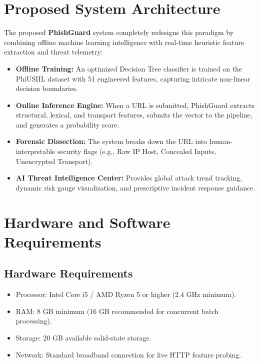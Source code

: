 \documentclass[BTech]{srmuthesis}
\begin{document}
\section{Proposed System Architecture}
The proposed \textbf{PhishGuard} system completely redesigns this paradigm by combining offline machine learning intelligence with real-time heuristic feature extraction and threat telemetry:
\begin{itemize}
    \item \textbf{Offline Training:} An optimized Decision Tree classifier is trained on the PhiUSIIL dataset with 51 engineered features, capturing intricate non-linear decision boundaries.
    \item \textbf{Online Inference Engine:} When a URL is submitted, PhishGuard extracts structural, lexical, and transport features, submits the vector to the pipeline, and generates a probability score.
    \item \textbf{Forensic Dissection:} The system breaks down the URL into human-interpretable security flags (e.g., Raw IP Host, Concealed Inputs, Unencrypted Transport).
    \item \textbf{AI Threat Intelligence Center:} Provides global attack trend tracking, dynamic risk gauge visualization, and prescriptive incident response guidance.
\end{itemize}

\section{Hardware and Software Requirements}
\subsection{Hardware Requirements}
\begin{itemize}
    \item Processor: Intel Core i5 / AMD Ryzen 5 or higher (2.4 GHz minimum).
    \item RAM: 8 GB minimum (16 GB recommended for concurrent batch processing).
    \item Storage: 20 GB available solid-state storage.
    \item Network: Standard broadband connection for live HTTP feature probing.
\end{itemize}
\end{document}
